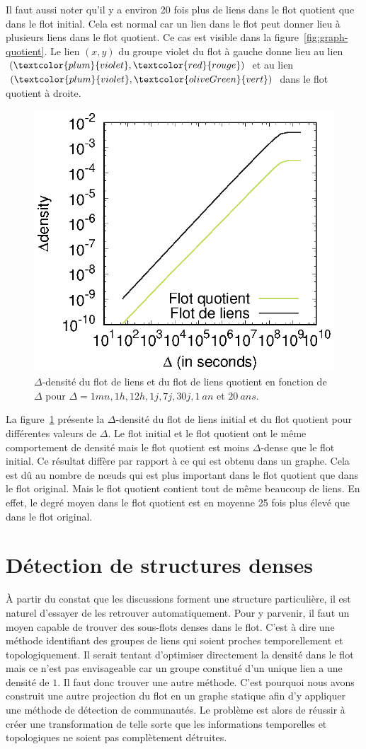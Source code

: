 Il faut aussi noter qu'il y a environ 20 fois plus de liens dans le flot quotient que dans le flot initial.
Cela est normal car un lien dans le flot peut donner lieu à plusieurs liens dans le flot quotient.
Ce cas est visible dans la figure~\ref{fig:graph-quotient}. 
Le lien $(x,y)$ du groupe violet du flot à gauche donne lieu au lien $(\textcolor{plum}{violet}, \textcolor{red}{rouge})$ et au lien $(\textcolor{plum}{violet}, \textcolor{oliveGreen}{vert})$ dans le flot quotient à droite. 

\begin{figure}
\centering
	\includegraphics[width=0.4\linewidth]{img/mailing/quotient-density}
	\caption{$\Delta$-densité du flot de liens et du flot de liens quotient en fonction de $\Delta$ pour $\Delta=1mn, 1h, 12h, 1j, 7j, 30j, 1\ an$ et $20\ ans$.}
	\label{fig:quotient-stream-density}
\end{figure}

La figure~\ref{fig:quotient-stream-density} présente la $\Delta$-densité du flot de liens initial et du flot quotient pour différentes valeurs de $\Delta$.
Le flot initial et le flot quotient ont le même comportement de densité mais le flot quotient est moins $\Delta$-dense que le flot initial.
Ce résultat diffère par rapport à ce qui est obtenu dans un graphe.
Cela est dû au nombre de n\oe{}uds qui est plus important dans le flot quotient que dans le flot original.
Mais le flot quotient contient tout de même beaucoup de liens. 
En effet, le degré moyen dans le flot quotient est en moyenne 25 fois plus élevé que dans le flot original.


\section{Détection de structures denses}

\`A partir du constat que les discussions forment une structure particulière, il est naturel d'essayer de les retrouver automatiquement. 
Pour y parvenir, il faut un moyen capable de trouver des sous-flots denses dans le flot.
C'est à dire une méthode identifiant des groupes de liens qui soient proches temporellement et topologiquement.
Il serait tentant d'optimiser directement la densité dans le flot mais ce n'est pas envisageable car un groupe constitué d'un unique lien a une densité de $1$.
Il faut donc trouver une autre méthode.
C'est pourquoi nous avons construit une autre projection du flot en un graphe statique afin d'y appliquer une méthode de détection de communautés.
Le problème est alors de réussir à créer une transformation de telle sorte que les informations temporelles et topologiques ne soient pas complètement détruites.

